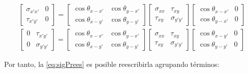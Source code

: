 \documentclass[12pt,letterpaper, twoside, openany]{article}
\begin{document}
\begin{large}
%
	\begin{align}
		\left[ \begin{array}{cc}
		\sigma_{x'x'} & 0 \\  
		\tau_{x'y'} & 0
		\end{array}  \right]=
%
		\left[ \begin{array}{cc}
		\cos \theta_{x-x'} & \cos \theta_{y-x'} \\  
		\cos \theta_{x-y'} & \cos \theta_{y-y'}
		\end{array}  \right]
%		
		\left[ \begin{array}{cc}
		\sigma_{xx} & \tau_{xy} \\  
		\tau_{xy} & \sigma_{y'y'}
		\end{array}  \right]
%		
		\left[ \begin{array}{cc}
		\cos \theta_{x-x'} & 0\\ 
		\cos \theta_{y-x'} & 0
		\end{array}  \right]
		\label{eq:Tequ}
	\end{align}
%
	\begin{align}
		\left[ \begin{array}{cc}
		 0 & \tau_{x'y'} \\  
		0 & \sigma_{y'y'} 
		\end{array}  \right]=
%		
		\left[ \begin{array}{cc}
		\cos \theta_{x-x'} & \cos \theta_{y-x'} \\  
		\cos \theta_{x-y'} & \cos \theta_{y-y'}
		\end{array}  \right]
%		
		\left[ \begin{array}{cc}
		\sigma_{xx} & \tau_{xy} \\  
		\tau_{xy} & \sigma_{y'y'}
		\end{array}  \right]
%		
		\left[ \begin{array}{cc}
		\cos \theta_{x-y'} & 0\\ 
		\cos \theta_{y-y'} & 0
		\end{array}  \right]
		\label{eq:Gequ}
	\end{align}
\end{large}
%
Por tanto, la \cref{eq:sigPrees} es posible reescribirla agrupando términos:
%
\end{document}
